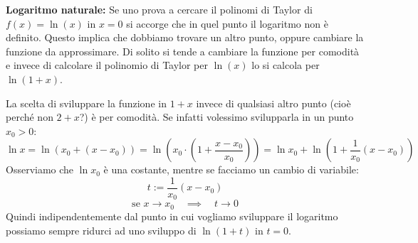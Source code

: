 \textbf{Logaritmo naturale:} Se uno prova a cercare il polinomi di Taylor di 
$f(x) = \ln{(x)}$ in $x = 0$ si accorge che in quel punto il logaritmo non è 
definito. Questo implica che dobbiamo trovare un altro punto, oppure cambiare 
la funzione da approssimare. Di solito si tende a cambiare la funzione per 
comodità e invece di calcolare il polinomio di Taylor per $\ln{(x)}$ lo si 
calcola per $\ln{(1 + x)}$.

La scelta di sviluppare la funzione in $1 + x$ invece di qualsiasi altro punto 
(cioè perché non $2 + x$?) è per comodità. Se infatti volessimo svilupparla in 
un punto $x_0 > 0$:
\begin{equation*}
	\ln{x} = \ln (x_0 + (x - x_0)) = \ln \left(x_0 \cdot \left(1 + \dfrac{x - 
    x_0}{x_0} \right) \right) = \ln{x_0} + \ln \left( 1 + \dfrac{1}{x_0}(x - 
    x_0) \right)
\end{equation*}
Osserviamo che $\ln{x_0}$ è una costante, mentre se facciamo un cambio di 
variabile:
\begin{equation*}
	t := \dfrac{1}{x_0} (x - x_0)
\end{equation*}
\begin{equation*}
	\text{se } x \to x_0 \quad \implies \quad t \to 0
\end{equation*}
Quindi indipendentemente dal punto in cui vogliamo sviluppare il logaritmo 
possiamo sempre ridurci ad uno sviluppo di $\ln(1 + t)$ in $t = 0$. 

